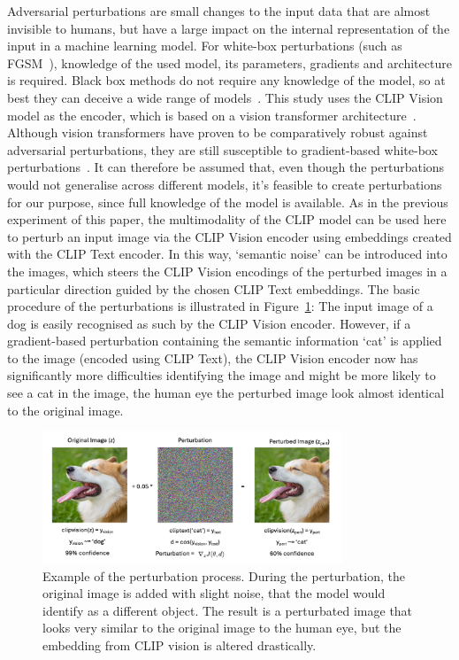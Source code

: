 Adversarial perturbations are small changes to the input data that are almost invisible to humans, but have a large impact on the internal representation of the input in a machine learning model. For white-box perturbations (such as FGSM~\cite{goodfellowExplainingHarnessingAdversarial2014}), knowledge of the used model, its parameters, gradients and architecture is required. Black box methods do not require any knowledge of the model, so at best they can deceive a wide range of models~\cite{papernotPracticalBlackBoxAttacks2017}. This study uses the CLIP Vision model as the encoder, which is based on a vision transformer architecture~\cite{dosovitskiyImageWorth16x162021}. Although vision transformers have proven to be comparatively robust against adversarial perturbations, they are still susceptible to gradient-based white-box perturbations~\cite{naseerIntriguingPropertiesVision2021}. It can therefore be assumed that, even though the perturbations would not generalise across different models, it's feasible to create perturbations for our purpose, since full knowledge of the model is available. As in the previous experiment of this paper, the multimodality of the CLIP model can be used here to perturb an input image via the CLIP Vision encoder using embeddings created with the CLIP Text encoder. In this way, `semantic noise' can be introduced into the images, which steers the CLIP Vision encodings of the perturbed images in a particular direction guided by the chosen CLIP Text embeddings. The basic procedure of the perturbations is illustrated in Figure~\ref{fig:perturbation_example}: The input image of a dog is easily recognised as such by the CLIP Vision encoder. However, if a gradient-based perturbation containing the semantic information `cat' is applied to the image (encoded using CLIP Text), the CLIP Vision encoder now has significantly more difficulties identifying the image and might be more likely to see a cat in the image,  the human eye the perturbed image look almost identical to the original image.

\begin{figure}[ht]
    \centering
    \includegraphics[width=0.8\textwidth]{plots/peturbation_example.png}
    \caption[Example of the perturbation process]{Example of the perturbation process. During the perturbation, the original image is added with slight noise, that the model would identify as a different object. The result is a perturbated image that looks very similar to the original image to the human eye, but the embedding from CLIP vision is altered drastically.}\label{fig:perturbation_example}
\end{figure}

